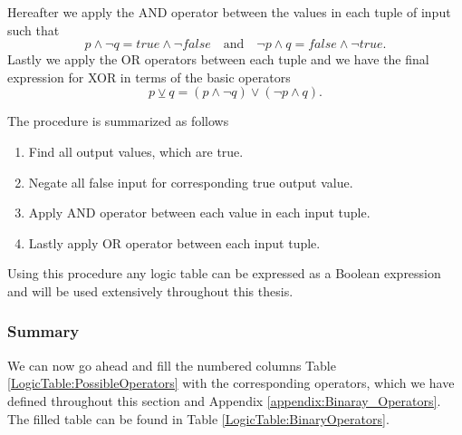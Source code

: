                 Hereafter we apply the AND operator between the values in each tuple of input such that
                \begin{equation}
                    p \wedge \neg q = true \wedge \neg false \quad \text{and} \quad \neg p \wedge q = false \wedge \neg true.
                \end{equation}
                Lastly we apply the OR operators between each tuple and we have the final expression for XOR in terms of the basic operators
                \begin{equation}
                    p \veebar q = (p \wedge \neg q) \vee (\neg p \wedge q).
                \end{equation}
                
                The procedure is summarized as follows
                \begin{enumerate}
                    \item Find all output values, which are true.
                    \item Negate all false input for corresponding true output value.
                    \item Apply AND operator between each value in each input tuple.
                    \item Lastly apply OR operator between each input tuple.
                \end{enumerate}
                Using this procedure any logic table can be expressed as a Boolean expression and will be used extensively throughout this thesis.
                
                
            \subsubsection{Summary}
            
                We can now go ahead and fill the numbered columns Table \ref{LogicTable:PossibleOperators} with the corresponding operators, which we have defined throughout this section and Appendix \ref{appendix:Binaray_Operators}. The filled table can be found in Table \ref{LogicTable:BinaryOperators}. 
                
